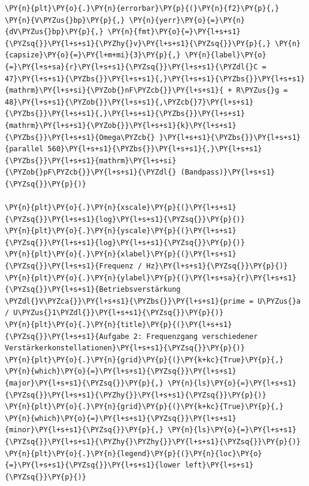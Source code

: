 \begin{tcolorbox}[breakable, size=fbox, boxrule=1pt, pad at break*=1mm,colback=cellbackground, colframe=cellborder]
\begin{Verbatim}[commandchars=\\\{\}]
\PY{n}{plt}\PY{o}{.}\PY{n}{errorbar}\PY{p}{(}\PY{n}{f2}\PY{p}{,} \PY{n}{V\PYZus{}bp}\PY{p}{,} \PY{n}{yerr}\PY{o}{=}\PY{n}{dV\PYZus{}bp}\PY{p}{,} \PY{n}{fmt}\PY{o}{=}\PY{l+s+s1}{\PYZsq{}}\PY{l+s+s1}{\PYZhy{}v}\PY{l+s+s1}{\PYZsq{}}\PY{p}{,} \PY{n}{capsize}\PY{o}{=}\PY{l+m+mi}{3}\PY{p}{,} \PY{n}{label}\PY{o}{=}\PY{l+s+sa}{r}\PY{l+s+s1}{\PYZsq{}}\PY{l+s+s1}{\PYZdl{}C = 47}\PY{l+s+s1}{\PYZbs{}}\PY{l+s+s1}{,}\PY{l+s+s1}{\PYZbs{}}\PY{l+s+s1}{mathrm}\PY{l+s+si}{\PYZob{}nF\PYZcb{}}\PY{l+s+s1}{ + R\PYZus{}g = 48}\PY{l+s+s1}{\PYZob{}}\PY{l+s+s1}{,\PYZcb{}7}\PY{l+s+s1}{\PYZbs{}}\PY{l+s+s1}{,}\PY{l+s+s1}{\PYZbs{}}\PY{l+s+s1}{mathrm}\PY{l+s+s1}{\PYZob{}}\PY{l+s+s1}{k}\PY{l+s+s1}{\PYZbs{}}\PY{l+s+s1}{Omega\PYZcb{} }\PY{l+s+s1}{\PYZbs{}}\PY{l+s+s1}{parallel 560}\PY{l+s+s1}{\PYZbs{}}\PY{l+s+s1}{,}\PY{l+s+s1}{\PYZbs{}}\PY{l+s+s1}{mathrm}\PY{l+s+si}{\PYZob{}pF\PYZcb{}}\PY{l+s+s1}{\PYZdl{} (Bandpass)}\PY{l+s+s1}{\PYZsq{}}\PY{p}{)}

\PY{n}{plt}\PY{o}{.}\PY{n}{xscale}\PY{p}{(}\PY{l+s+s1}{\PYZsq{}}\PY{l+s+s1}{log}\PY{l+s+s1}{\PYZsq{}}\PY{p}{)}
\PY{n}{plt}\PY{o}{.}\PY{n}{yscale}\PY{p}{(}\PY{l+s+s1}{\PYZsq{}}\PY{l+s+s1}{log}\PY{l+s+s1}{\PYZsq{}}\PY{p}{)}
\PY{n}{plt}\PY{o}{.}\PY{n}{xlabel}\PY{p}{(}\PY{l+s+s1}{\PYZsq{}}\PY{l+s+s1}{Frequenz / Hz}\PY{l+s+s1}{\PYZsq{}}\PY{p}{)}
\PY{n}{plt}\PY{o}{.}\PY{n}{ylabel}\PY{p}{(}\PY{l+s+sa}{r}\PY{l+s+s1}{\PYZsq{}}\PY{l+s+s1}{Betriebsverstärkung \PYZdl{}V\PYZca{}}\PY{l+s+s1}{\PYZbs{}}\PY{l+s+s1}{prime = U\PYZus{}a / U\PYZus{}1\PYZdl{}}\PY{l+s+s1}{\PYZsq{}}\PY{p}{)}
\PY{n}{plt}\PY{o}{.}\PY{n}{title}\PY{p}{(}\PY{l+s+s1}{\PYZsq{}}\PY{l+s+s1}{Aufgabe 2: Frequenzgang verschiedener Verstärkerkonstellationen}\PY{l+s+s1}{\PYZsq{}}\PY{p}{)}
\PY{n}{plt}\PY{o}{.}\PY{n}{grid}\PY{p}{(}\PY{k+kc}{True}\PY{p}{,} \PY{n}{which}\PY{o}{=}\PY{l+s+s1}{\PYZsq{}}\PY{l+s+s1}{major}\PY{l+s+s1}{\PYZsq{}}\PY{p}{,} \PY{n}{ls}\PY{o}{=}\PY{l+s+s1}{\PYZsq{}}\PY{l+s+s1}{\PYZhy{}}\PY{l+s+s1}{\PYZsq{}}\PY{p}{)}
\PY{n}{plt}\PY{o}{.}\PY{n}{grid}\PY{p}{(}\PY{k+kc}{True}\PY{p}{,} \PY{n}{which}\PY{o}{=}\PY{l+s+s1}{\PYZsq{}}\PY{l+s+s1}{minor}\PY{l+s+s1}{\PYZsq{}}\PY{p}{,} \PY{n}{ls}\PY{o}{=}\PY{l+s+s1}{\PYZsq{}}\PY{l+s+s1}{\PYZhy{}\PYZhy{}}\PY{l+s+s1}{\PYZsq{}}\PY{p}{)}
\PY{n}{plt}\PY{o}{.}\PY{n}{legend}\PY{p}{(}\PY{n}{loc}\PY{o}{=}\PY{l+s+s1}{\PYZsq{}}\PY{l+s+s1}{lower left}\PY{l+s+s1}{\PYZsq{}}\PY{p}{)}
\end{Verbatim}
\end{tcolorbox}

    \begin{center}
    \end{center}
    { \hspace*{\fill} \\}
    

    
    
    
